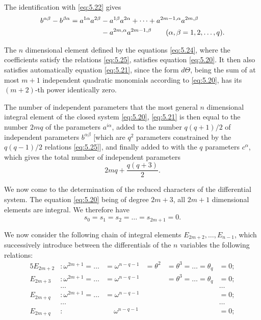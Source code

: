 \documentclass[leqno,11pt]{book}
\numberwithin{equation}{chapter}
\theoremstyle{shape1}
\theoremstyle{shape0}
\theoremstyle{shape2}
\theoremstyle{definition}
\begin{document}
The identification with \eqref{eq:5.22} gives
\begin{align}
  \label{eq:5.25}
  b^{\alpha\beta}-b^{\beta\alpha}=a^{1\alpha}a^{2\beta}&-a^{1\beta}a^{2\alpha}+\dots+a^{2m-1,\alpha}a^{2m,\beta}\\
  &-a^{2m,\alpha}a^{2m-1,\beta}\qquad(\alpha,\beta=1,2,\dots,q).
  \notag
\end{align}

The $n$ dimensional element defined by the equations \eqref{eq:5.24}, where the coefficients satisfy the relations \eqref{eq:5.25}, satisfies equation \eqref{eq:5.20}. It then also satisfies automatically equation \eqref{eq:5.21}, since the form $d\Theta$, being the sum of at most $m+1$ independent quadratic monomials according to \eqref{eq:5.20}, has its $(m+2)$-th power identically zero.

The number of independent parameters that the most general $n$ dimensional integral element of the closed system \eqref{eq:5.20}, \eqref{eq:5.21} is then equal to the number $2mq$ of the parameters $a^{i\alpha}$, added to the number $q(q+1)/2$ of independent parameters $b^{\alpha\beta}$ [which are $q^{2}$ parameters constrained by the $q(q-1)/2$ relations \eqref{eq:5.25}], and finally added to with the $q$ parameters $c^{\alpha}$, which gives the total number of independent parameters
\begin{equation}
  \label{eq:5.26}
  2mq+\frac{q(q+3)}{2}.
\end{equation}



\vspace{12pt}\fsec We now come to the determination of the reduced characters of the differential system. The equation \eqref{eq:5.20} being of degree $2m+3$, all $2m+1$ dimensional elements are integral. We therefore have
\[
s_{0}=s_{1}=s_{2}=\dots=s_{2m+1}=0.
\]

We now consider the following chain of integral elements $E_{2m+2},\dots,E_{n-1}$, which successively introduce between the differentials of the $n$ variables the following relations:
\begin{alignat*}{5}
  E_{2m+2}&:\omega^{2m+1}=\dots&=\omega^{n-q-1}&=\theta^{2}&=\theta^{3}=\dots=\theta_{q}&=0;\\
  E_{2m+3}&:\omega^{2m+1}=\dots&=\omega^{n-q-1}&&=\theta^{3}=\dots=\theta_{q}&=0;\\
  &\dots&&&&\dots\\
  E_{2m+q}&:\omega^{2m+1}=\dots&=\omega^{n-q-1}&&&=0;\\
  &\dots&&&&\dots\\
  E_{2m+q}&:&\quad\ \omega^{n-q-1}&&&=0;\\
\end{alignat*}
\end{document}
